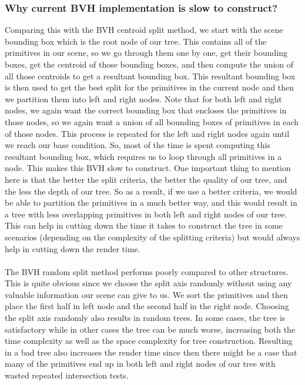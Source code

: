 \documentclass[11pt,a4paper]{article}
\begin{document}
\subsubsection{Why current BVH implementation is slow to construct?}
Comparing this with the BVH centroid split method, we start with the scene bounding box which is the root node of our tree. This contains all of the primitives in our scene, so we go through them one by one, get their bounding boxes, get the centroid of those bounding boxes, and then compute the union of all those centroids to get a resultant bounding box. This resultant bounding box is then used to get the best split for the primitives in the current node and then we partition them into left and right nodes. Note that for both left and right nodes, we again want the correct bounding box that encloses the primitives in those nodes, so we again want a union of all bounding boxes of primitives in each of those nodes. This process is repeated for the left and right nodes again until we reach our base condition. So, most of the time is spent computing this resultant bounding box, which requires us to loop through all primitives in a node. This makes this BVH slow to construct. One important thing to mention here is that the better the split criteria, the better the quality of our tree, and the less the depth of our tree. So as a result, if we use a better criteria, we would be able to partition the primitives in a much better way, and this would result in a tree with less overlapping primitives in both left and right nodes of our tree. This can help in cutting down the time it takes to construct the tree in some scenarios (depending on the complexity of the splitting criteria) but would always help in cutting down the render time.
\\~\\
The BVH random split method performs poorly compared to other structures. This is quite obvious since we choose the split axis randomly without using any valuable information our scene can give to us. We sort the primitives and then place the first half in left node and the second half in the right node. Choosing the split axis randomly also results in random trees. In some cases, the tree is satisfactory while in other cases the tree can be much worse, increasing both the time complexity as well as the space complexity for tree construction. Resulting in a bad tree also increases the render time since then there might be a case that many of the primitives end up in both left and right nodes of our tree with wasted repeated intersection tests.
\end{document}

